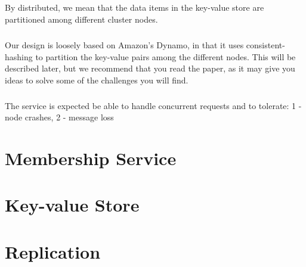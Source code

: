 \documentclass{report}
\begin{document}
			\paragraph{}By distributed, we mean that the data items in the key-value
			store are partitioned among different cluster nodes.
			
			\paragraph{} Our design is loosely based on Amazon's Dynamo, in that it
			uses consistent-hashing to partition the key-value pairs among the 
			different nodes. This will be described later, but we recommend that 
			you read the paper, as it may give you ideas to solve some of the 
			challenges you will find.
			
			\paragraph{}The service is expected be able to handle concurrent requests 
			and to tolerate:
			        1 - node crashes,
			        2 - message loss
	
	\chapter{Membership Service}
	
	        \paragraph{}
	        
	        \paragraph{}
	
	\chapter{Key-value Store}
	
	        \paragraph{}
	        
	        \paragraph{}
	
	\chapter{Replication}
	
\end{document}
